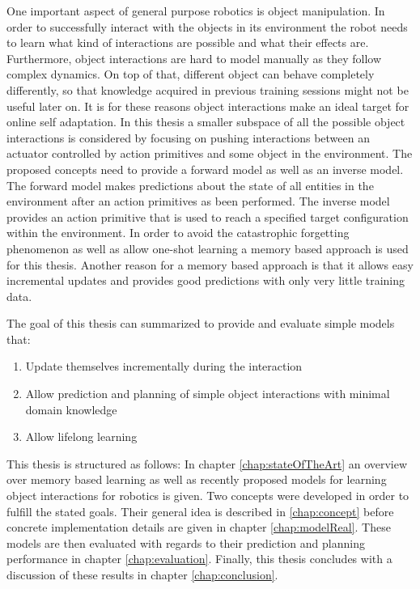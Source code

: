 One important aspect of general purpose robotics is object manipulation. In order to successfully interact with the objects in its environment the robot needs to learn what kind of interactions are possible and what their effects are. 
Furthermore, object interactions are hard to model manually as they follow complex dynamics. On top of that, different object can behave completely differently, so that knowledge acquired in previous training sessions might not be useful later on. It is for these reasons object interactions make an ideal target for online self adaptation. 
In this thesis a smaller subspace of all the possible object interactions is considered by focusing on pushing interactions between an actuator controlled by action primitives and some object in the environment. 
The proposed concepts need to provide a forward model as well as an inverse model. The forward model makes predictions about the state of all entities in the environment after an action primitives as been performed. The inverse model provides an action primitive that is used to reach a specified target configuration within the environment.
In order to avoid the catastrophic forgetting phenomenon as well as allow one-shot learning a memory based approach is used for this thesis. Another reason for a memory based approach is that it allows easy incremental updates and provides good predictions with only very little training data.

The goal of this thesis can summarized to provide and evaluate simple models that:

\begin{enumerate}
	\item Update themselves incrementally during the interaction
	\item Allow prediction and planning of simple object interactions with minimal domain knowledge
	\item Allow lifelong learning
\end{enumerate}

This thesis is structured as follows: In chapter \ref{chap:stateOfTheArt} an overview over memory based learning as well as recently proposed models for learning object interactions for robotics is given. Two concepts were developed in order to fulfill the stated goals. Their general idea is described in \ref{chap:concept} before concrete implementation details are given in chapter \ref{chap:modelReal}. These models are then evaluated with regards to their prediction and planning performance in chapter \ref{chap:evaluation}. Finally, this thesis concludes with a discussion of these results in chapter \ref{chap:conclusion}.

